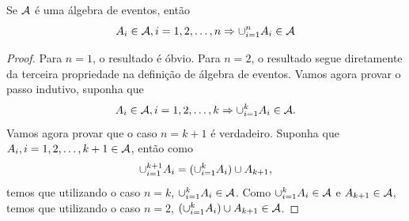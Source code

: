 %
\begin{frame}

\begin{teo} Se ${\cal A}$ é uma álgebra de eventos, então
$$A_i\in{\cal A},i=1,2,\ldots,n\Rightarrow \cup_{i=1}^{n}A_i \in {\cal A}$$
\end{teo}

\begin{proof} Para $n=1$, o resultado é óbvio. Para $n=2$, o resultado segue
diretamente da terceira propriedade na definição de álgebra de
eventos. Vamos agora provar o passo indutivo, suponha que
$$A_i\in{\cal A},i=1,2,\ldots,k\Rightarrow \cup_{i=1}^{k}A_i \in {\cal A}.$$
Vamos agora provar que o caso $n=k+1$ é verdadeiro. Suponha que
$A_i,i=1,2,\ldots,k+1\in{\cal A}$, então como
$$\cup_{i=1}^{k+1}A_i=(\cup_{i=1}^{k}A_i)\cup A_{k+1},$$
temos que utilizando o caso $n=k$, $\cup_{i=1}^{k}A_i\in{\cal A}$. Como $\cup_{i=1}^{k}A_i\in{\cal A}$ e $A_{k+1}\in {\cal A}$, temos que utilizando o caso $n=2$, $(\cup_{i=1}^{k}A_i)\cup A_{k+1}\in {\cal A}$.
\end{proof}

\end{frame}

